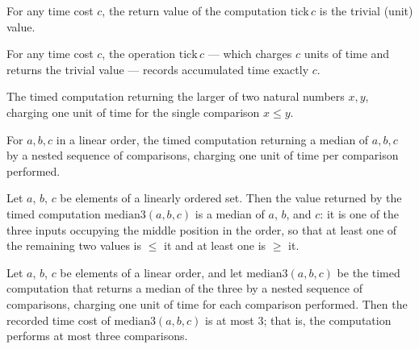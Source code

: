 \begin{theorem}
\label{TimeM.ret_tick}
\leanok
{}
For any time cost $c$, the return value of the computation $\mathrm{tick}\,c$ is the
trivial (unit) value.
\end{theorem}

\begin{theorem}
\label{TimeM.time_tick}
\leanok
{}
For any time cost $c$, the operation $\mathrm{tick}\,c$ — which charges $c$ units of
time and returns the trivial value — records accumulated time exactly $c$.
\end{theorem}

\begin{definition}
\label{max2}
\leanok
The timed computation returning the larger of two natural numbers $x,y$, charging one unit of
time for the single comparison $x \le y$.
\end{definition}

\begin{definition}
\label{median3}
\leanok
For $a,b,c$ in a linear order, the timed computation returning a median of $a,b,c$ by a nested
sequence of comparisons, charging one unit of time per comparison performed.
\end{definition}

\begin{theorem}
\label{median3_correct}
\leanok
{}
Let $a$, $b$, $c$ be elements of a linearly ordered set. Then the value returned by the
timed computation $\mathrm{median3}(a,b,c)$ is a median of $a$, $b$, and $c$: it is one
of the three inputs occupying the middle position in the order, so that at least one of
the remaining two values is $\le$ it and at least one is $\ge$ it.
\end{theorem}

\begin{theorem}
\label{median3_time}
\leanok
{}
Let $a$, $b$, $c$ be elements of a linear order, and let $\mathrm{median3}(a,b,c)$ be
the timed computation that returns a median of the three by a nested sequence of
comparisons, charging one unit of time for each comparison performed. Then the recorded
time cost of $\mathrm{median3}(a,b,c)$ is at most $3$; that is, the computation performs
at most three comparisons.
\end{theorem}

